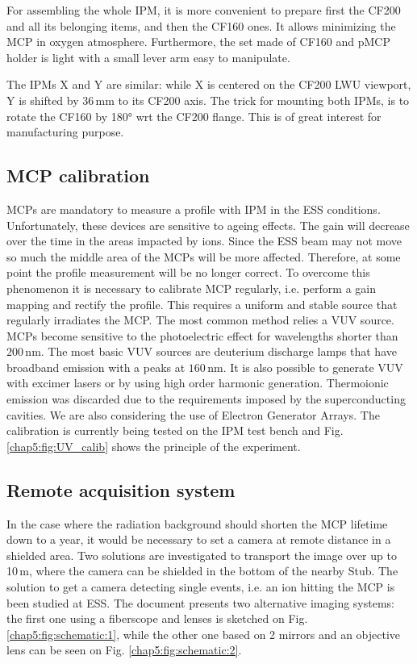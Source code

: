 \begin{refsection}
  For assembling the whole IPM, it is more convenient to prepare first the CF200 and all its belonging items, and then the CF160 ones. It allows minimizing the MCP in oxygen atmosphere. Furthermore, the set made of CF160 and pMCP holder is light with a small lever arm easy to manipulate.

  The IPMs X and Y are similar: while X is centered on the CF200 LWU viewport, Y is shifted by $36\,\mathrm{mm}$ to its CF200 axis. The trick for mounting both IPMs, is to rotate the CF160 by 180° wrt the CF200 flange. This is of great interest for manufacturing purpose.

  \subsection{MCP calibration}

  
  MCPs are mandatory to measure a profile with IPM in the ESS conditions. Unfortunately, these devices are sensitive to ageing effects. The gain will decrease over the time in the areas impacted by ions. Since the ESS beam may not move so much the middle area of the MCPs will be more affected. Therefore, at some point the profile measurement will be no longer correct. To overcome this phenomenon it is necessary to calibrate MCP regularly, i.e. perform a gain mapping and rectify the profile. This requires a uniform and stable source that regularly irradiates the MCP. The most common method relies a VUV source. MCPs become sensitive to the photoelectric effect for wavelengths shorter than $200\,\mathrm{nm}$. The most basic VUV sources are deuterium discharge lamps that have broadband emission with a peaks at $160\,\mathrm{nm}$. It is also possible to generate VUV with excimer lasers or by using high order harmonic generation. Thermoionic emission was discarded due to the requirements imposed by the superconducting cavities. We are also considering the use of Electron Generator Arrays. The calibration is currently being tested on the IPM test bench and Fig. \ref{chap5:fig:UV_calib} shows the principle of the experiment.

  \subsection{Remote acquisition system}
  In the case where the radiation background should shorten the MCP lifetime down to a year, it would be necessary to set a camera at remote distance in a shielded area. Two solutions are investigated to transport the image over up to 10\,m, where the camera can be shielded in the bottom of the nearby Stub. The solution to get a camera detecting single events, i.e. an ion hitting the MCP is been studied at ESS. The document presents two alternative imaging systems: the first one using a fiberscope and lenses is sketched on Fig. \ref{chap5:fig:schematic:1}, while the other one based on 2 mirrors and an objective lens can be seen on Fig. \ref{chap5:fig:schematic:2}.


\end{refsection}
